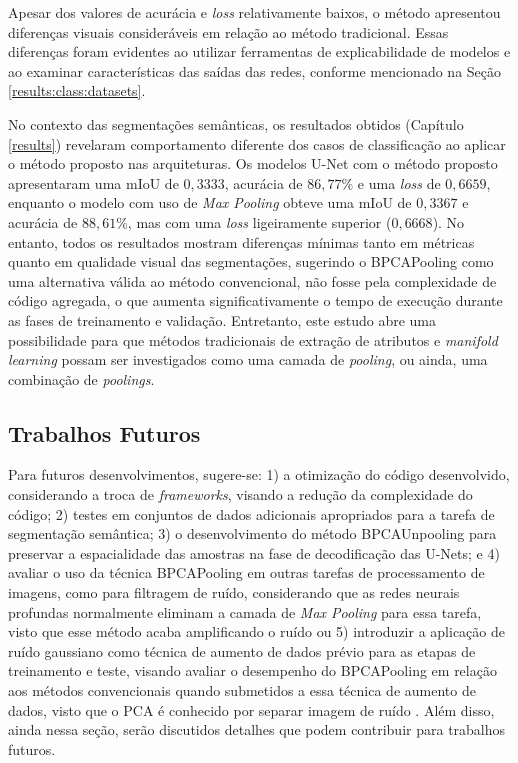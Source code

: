 Apesar dos valores de acurácia e \textit{loss} relativamente baixos, o método apresentou diferenças visuais consideráveis em relação ao método tradicional. Essas diferenças foram evidentes ao utilizar ferramentas de explicabilidade de modelos e ao examinar características das saídas das redes, conforme mencionado na Seção \ref{results:class:datasets}.

No contexto das segmentações semânticas, os resultados obtidos (Capítulo \ref{results}) revelaram comportamento diferente dos casos de classificação ao aplicar o método proposto nas arquiteturas. Os modelos U-Net com o método proposto apresentaram uma mIoU de $0,3333$, acurácia de $86,77\%$ e uma \textit{loss} de $0,6659$, enquanto o modelo com uso de \textit{Max Pooling} obteve uma mIoU de $0,3367$ e acurácia de $88,61\%$, mas com uma \textit{loss} ligeiramente superior ($0,6668$). No entanto, todos os resultados mostram diferenças mínimas tanto em métricas quanto em qualidade visual das segmentações, sugerindo o BPCAPooling como uma alternativa válida ao método convencional, não fosse pela complexidade de código agregada, o que aumenta significativamente o tempo de execução durante as fases de treinamento e validação. Entretanto, este estudo abre uma possibilidade para que métodos tradicionais de extração de atributos e \textit{manifold learning} possam ser investigados como uma camada de \textit{pooling}, ou ainda, uma combinação de \textit{poolings}.


\subsection{Trabalhos Futuros}
\label{conclusion:future}
Para futuros desenvolvimentos, sugere-se: 1) a otimização do código desenvolvido, considerando a troca de \textit{frameworks}, visando a redução da complexidade do código; 2) testes em conjuntos de dados adicionais apropriados para a tarefa de segmentação semântica; 3) o desenvolvimento do método BPCAUnpooling para preservar a espacialidade das amostras na fase de decodificação das U-Nets; e 4) avaliar o uso da técnica BPCAPooling em outras tarefas de processamento de imagens, como para filtragem de ruído, considerando que as redes neurais profundas normalmente eliminam a camada de \textit{Max Pooling} para essa tarefa, visto que esse método acaba amplificando o ruído \citep{zhang2017beyond} ou 5) introduzir a aplicação de ruído gaussiano como técnica de aumento de dados prévio para as etapas de treinamento e teste, visando avaliar o desempenho do BPCAPooling em relação aos métodos convencionais quando submetidos a essa técnica de aumento de dados, visto que o PCA é conhecido por separar imagem de ruído \citep{Zhou2011}. Além disso, ainda nessa seção, serão discutidos detalhes que podem contribuir para trabalhos futuros.

